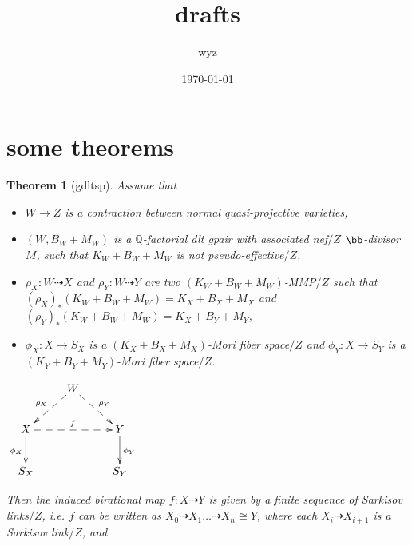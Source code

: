 \documentclass{article}
\title{drafts}
\author{wyz}
\date{\today}
\newtheorem{thm}[defn]{Theorem}
\begin{document}
  \maketitle
\section{some theorems}

\begin{thm}[gdltsp]\label{thm: gdltsp}
  Assume that
  \begin{itemize}
    \item $W\rightarrow Z$ is a contraction between normal quasi-projective varieties,
    \item $(W,B_W+M_W)$ is a $\mathbb Q$-factorial dlt gpair with associated nef$/Z$ $\bb$-divisor $M$, such that $K_W+B_W+M_W$ is not pseudo-effective$/Z$,
    \item $\rho_X: W\dashrightarrow X$ and $\rho_Y: W\dashrightarrow Y$ are two $(K_W+B_W+M_W)$-MMP$/Z$ such that $(\rho_X)_*(K_W+B_W+M_W)=K_X+B_X+M_X$ and $(\rho_Y)_*(K_W+B_W+M_W)=K_X+B_Y+M_Y$,
    \item $\phi_X: X\rightarrow S_X$ is a $(K_X+B_X+M_X)$-Mori fiber space$/Z$ and $\phi_Y: X\rightarrow S_Y$ is a $(K_Y+B_Y+M_Y)$-Mori fiber space$/Z$.
  \end{itemize}
  \begin{center}$\xymatrix{
        & W\ar@{-->}[dl]_{\rho_X}\ar@{-->}[dr]^{\rho_Y}& \\
        X \ar@{->}[d]_{\phi_X}\ar@{-->}[rr]^{f}   &  & Y\ar@{->}[d]^{\phi_Y} \\
        S_X & &S_Y }$
  \end{center}
  Then the induced birational map $f: X\dashrightarrow Y$ is given by a finite sequence of Sarkisov links$/Z$, i.e. $f$ can be written as $X_0\dashrightarrow X_1\dots\dashrightarrow X_n\cong Y$, where each $X_{i}\dashrightarrow X_{i+1}$ is a Sarkisov link$/Z$, and
\end{thm}
\end{document}
